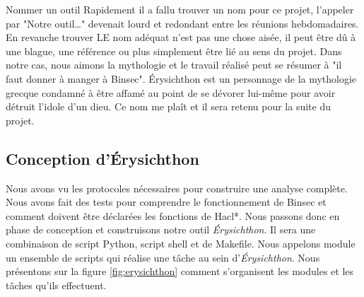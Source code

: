 \begin{CitationBox}{Nommer un outil}
    Rapidement il a fallu trouver un nom pour ce projet, l'appeler par "Notre outil\dots" devenait lourd et redondant entre les réunions hebdomadaires. En revanche trouver LE nom adéquat n'est pas une chose aisée, il peut être dû à une blague, une référence ou plus simplement être lié au sens du projet. Dans notre cas, nous aimons la mythologie et le travail réalisé peut se résumer à "il faut donner à manger à Binsec".\smallbreak
    Érysichthon est un personnage de la mythologie grecque condamné à être affamé au point de se dévorer lui-même pour avoir détruit l'idole d'un dieu. Ce nom me plaît et il sera retenu pour la suite du projet. 
\end{CitationBox}

\subsection*{Conception d'Érysichthon}


Nous avons vu les protocoles nécessaires pour construire une analyse complète. Nous avons fait des tests pour comprendre le fonctionnement de Binsec et comment doivent être déclarées les fonctions de Hacl*. Nous passons donc en phase de conception et construisons notre outil \textit{Érysichthon}. Il sera une combinaison de script Python, script shell et de Makefile. Nous appelons module un ensemble de scripts qui réalise une tâche au sein d'\textit{Érysichthon}. Nous présentons sur la figure \ref{fig:erysichthon} comment s'organisent les modules et les tâches qu'ils effectuent.

